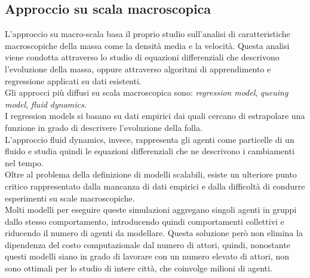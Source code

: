 \subsection{Approccio su scala macroscopica}
L'approccio su macro-scala basa il proprio studio sull'analisi di caratteristiche macroscopiche della massa come la densità media e la velocità. Questa analisi viene condotta attraverso lo studio di equazioni differenziali che descrivono l'evoluzione della massa, oppure attraverso algoritmi di apprendimento e regressione applicati su dati esistenti. \\
Gli approcci più diffusi su scala macroscopica sono: \textit{regression model}, \textit{queuing model}, \textit{fluid dynamics}.\\
I regression models si basano su dati empirici dai quali cercano di estrapolare una funzione in grado di descrivere l'evoluzione della folla.\\
L'approccio fluid dynamics, invece, rappresenta gli agenti come particelle di un fluido e studia quindi le equazioni differenziali che ne descrivono i cambiamenti nel tempo.\\
Oltre al problema della definizione di modelli scalabili, esiste un ulteriore punto critico rappresentato dalla mancanza di dati empirici e dalla difficoltà di condurre esperimenti su scale macroscopiche.\\
Molti modelli per eseguire queste simulazioni aggregano singoli agenti in gruppi dallo stesso comportamento, introducendo quindi comportamenti collettivi e riducendo il numero di agenti da modellare. Questa soluzione però non elimina la dipendenza del costo computazionale dal numero di attori, quindi, nonostante questi modelli siano in grado di lavorare con un numero elevato di attori, non sono ottimali per lo studio di intere città, che coinvolge milioni di agenti.

